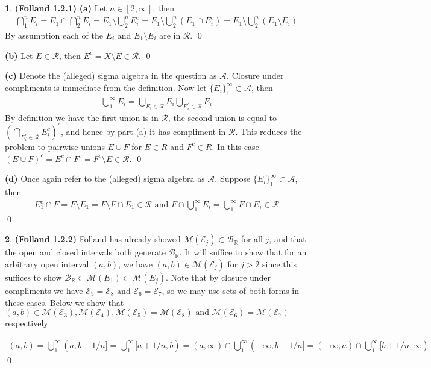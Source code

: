 \documentclass[10.5pt]{article}
\theoremstyle{definition}
\newtheorem{pb}{}
\newcommand{\set}[1]{\{#1\}}
\newcommand{\tand}{\text{ and }}
\begin{document}
    \begin{pb} \textbf{(Folland 1.2.1)}
        \textbf{(a)} Let \(n \in [2,\infty]\), then \begin{align*}
            \bigcap_1^n E_i = E_1 \cap \bigcap_2^n E_i = E_1 \setminus \bigcup_2^n E_i^c = E_1 \setminus \bigcup_2^n (E_1 \cap E_i^c) = E_1 \setminus \bigcup_2^n (E_1 \setminus E_i)
        \end{align*}
        By assumption each of the \(E_i\) and \(E_1 \setminus E_i\) are in \(\mathcal{R}\). \qed

        \textbf{(b)} Let \(E \in \mathcal{R}\), then \(E^c = X \setminus E \in \mathcal{R}\). \qed

        \textbf{(c)} Denote the (alleged) sigma algebra in the question as \(\mathcal{A}\). Closure under compliments is immediate from the definition. Now let \(\set{E_i}_1^\infty \subset \mathcal{A}\), then
        \begin{align*}
            \bigcup_1^\infty E_i = \bigcup_{E_i \in \mathcal{R}} E_i \bigcup_{E_i^c \in \mathcal{R}} E_i 
        \end{align*}
        By definition we have the first union is in \(\mathcal{R}\), the second union is equal to \(\left(\bigcap_{E_i^c \in \mathcal{R}}E_i^c\right)^c\), and hence by part (a) it has compliment in \(\mathcal{R}\). This reduces the problem to pairwise unions \(E \cup F\) for \(E \in R\) and \(F^c \in R\). In this case \((E \cup F)^c = E^c \cap F^c = F^c \setminus E \in \mathcal{R}\). \qed

        \textbf{(d)} Once again refer to the (alleged) sigma algebra as \(\mathcal{A}\). Suppose \(\set{E_i}_1^\infty \subset \mathcal{A}\), then
        \begin{align*}
            E_1^c \cap F = F \setminus E_1 = F \setminus F \cap E_1 \in \mathcal{R} \tand F \cap \bigcup_1^\infty E_i = \bigcup_1^\infty F \cap E_i \in \mathcal{R}
        \end{align*} \qed
    \end{pb}
    \begin{pb} \textbf{(Folland 1.2.2)}
        Folland has already showed \(\mathcal{M}(\mathcal{E}_j) \subset \mathcal{B}_\mathbb{R}\) for all \(j\), and that the open and closed intervals both generate \(\mathcal{B}_\mathbb{R}\). It will suffice to show that for an arbitrary open interval \((a,b)\), we have \((a,b) \in \mathcal{M}(\mathcal{E}_j)\) for \(j > 2\) since this suffices to show \(\mathcal{B}_\mathbb{R} \subset \mathcal{M}(E_1) \subset \mathcal{M}(E_j)\). Note that by closure under compliments we have \(\mathcal{E}_5 = \mathcal{E}_8 \tand \mathcal{E}_6 = \mathcal{E}_7\), so we may use sets of both forms in these cases. Below we show that \((a,b) \in \mathcal{M}(\mathcal{E}_3),\mathcal{M}(\mathcal{E}_4),\mathcal{M}(\mathcal{E}_5) = \mathcal{M}(\mathcal{E}_8) \tand \mathcal{M}(\mathcal{E}_6) = \mathcal{M}(\mathcal{E}_7)\) respectively

        \begin{align*}
            (a,b) = \bigcup_1^\infty (a,b - 1/n] = \bigcup_1^\infty [a + 1/n,b) = (a,\infty) \cap \bigcup_1^\infty (-\infty, b - 1/n] = (-\infty,a) \cap\bigcup_1^\infty[b+1/n,\infty)
        \end{align*}
        \qed
    \end{pb}
\end{document}
